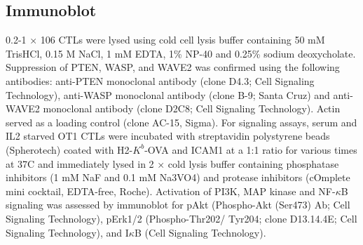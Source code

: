 \subsection{Immunoblot}
0.2-1 × 106 CTLs were lysed using cold cell lysis buffer containing 50 mM TrisHCl, 0.15 M NaCl, 1 mM EDTA, 1\% NP-40 and 0.25\% sodium deoxycholate. Suppression of PTEN, WASP, and WAVE2 was confirmed using the following antibodies: anti-PTEN monoclonal antibody (clone D4.3; Cell Signaling Technology), anti-WASP monoclonal antibody (clone B-9; Santa Cruz) and anti-WAVE2 monoclonal antibody (clone D2C8; Cell Signaling Technology). Actin served as a loading control (clone AC-15, Sigma). For signaling assays, serum and IL2 starved OT1 CTLs were incubated with streptavidin polystyrene beads (Spherotech) coated with H2-$K^{b}$-OVA and ICAM1 at a 1:1 ratio for various times at 37\degree C and immediately lysed in 2 × cold lysis buffer containing phosphatase inhibitors (1 mM NaF and 0.1 mM Na3VO4) and protease inhibitors (cOmplete mini cocktail, EDTA-free, Roche). Activation of PI3K, MAP kinase and NF-$\kappa$B signaling was assessed by immunoblot for pAkt (Phospho-Akt (Ser473) Ab; Cell Signaling Technology), pErk1/2 (Phospho-Thr202/ Tyr204; clone D13.14.4E; Cell Signaling Technology), and I$\kappa$B (Cell Signaling Technology).
